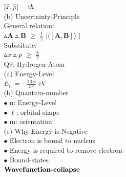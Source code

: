 \documentclass[10pt,fancy]{elegantbook}
\begin{document}
{        [$\hat x, \hat p]$ = i$\hbar$ \\
 
(b) Uncertainty-Principle \\
                                                                                                
    General relation: \\
 
       $\vartriangle \mathbf A \vartriangle \mathbf B$ $\geq$ $\frac{1}{2}$ $\mid \langle [ \mathbf A, \mathbf B] \rangle \mid$ \\
  
    Substitute: \\
 
       $\vartriangle x \vartriangle p$ $\geq$ $\frac{\hbar}{2}$  \\

Q9. Hydrogen-Atom \\
                                                                                       
    (a) Energy-Level \\

    $E_n$ = - $\frac{13.6}{n^2}$ eV \\
 
    (b) Quantum-number  \\
                                                                                                 
    $\bullet$ n: Energy-Level  \\
  
    $\bullet$ $\ell$: orbital-shape \\
 
    $\bullet$ m: orientation \\
 
    (c) Why Energy is Negative  \\
  
    $\bullet$ Electron is bound to nucleus  \\
  
    $\bullet$ Energy is required to remove electron   \\
 
    $\bullet$ Bound-states \\

$\mathbf{\textbf{Wavefunction-collapse\index{Wavefunction-collapse}}}$   \\
 
}
\end{document}
